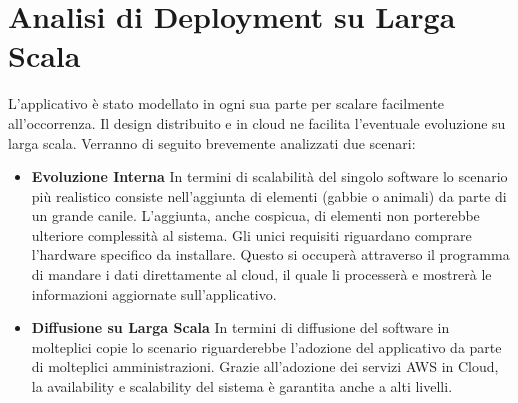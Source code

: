 

\chapter{Analisi di Deployment su Larga Scala}
L'applicativo è stato modellato in ogni sua parte per scalare facilmente all'occorrenza. Il design distribuito e in cloud ne facilita l'eventuale evoluzione su larga scala.
Verranno di seguito brevemente analizzati due scenari: 
\begin{itemize}
    \item  \textbf{Evoluzione Interna} In termini di scalabilità del singolo software lo scenario più realistico consiste nell'aggiunta di elementi (gabbie o animali) da parte di un grande canile. L'aggiunta, anche cospicua, di elementi non porterebbe ulteriore complessità al sistema. Gli unici requisiti riguardano comprare l'hardware specifico da installare. Questo si occuperà attraverso il programma di mandare i dati direttamente al cloud, il quale li processerà e mostrerà le informazioni aggiornate sull'applicativo.
    \item  \textbf{Diffusione su Larga Scala} In termini di diffusione del software in molteplici copie lo scenario riguarderebbe l'adozione del applicativo da parte di molteplici amministrazioni. Grazie all'adozione dei servizi AWS in Cloud, la availability e scalability del sistema è garantita anche a alti livelli.
\end{itemize}